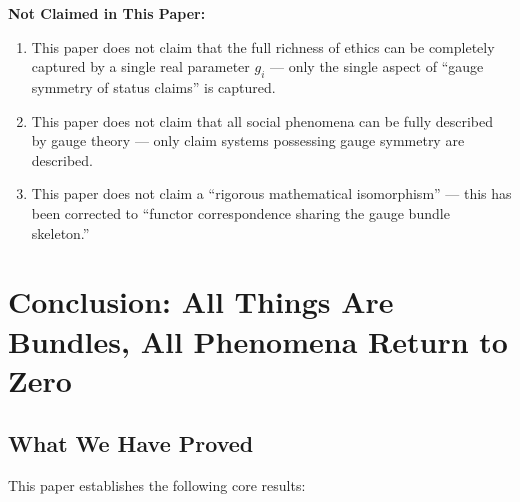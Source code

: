 \documentclass[12pt,a4paper]{article}
\theoremstyle{plain}
\theoremstyle{definition}
\begin{document}
\begin{scxbox}
\textbf{Not Claimed in This Paper:}
\begin{enumerate}[label=(\arabic*)]
    \item This paper does not claim that the full richness of ethics can be completely captured by a single real parameter $g_i$ — only the single aspect of ``gauge symmetry of status claims'' is captured.
    \item This paper does not claim that all social phenomena can be fully described by gauge theory — only claim systems possessing gauge symmetry are described.
    \item This paper does not claim a ``rigorous mathematical isomorphism'' — this has been corrected to ``functor correspondence sharing the gauge bundle skeleton.''
\end{enumerate}
\end{scxbox}

\newpage


\section{Conclusion: All Things Are Bundles, All Phenomena Return to Zero}

\subsection{What We Have Proved}

This paper establishes the following core results:
\end{document}
